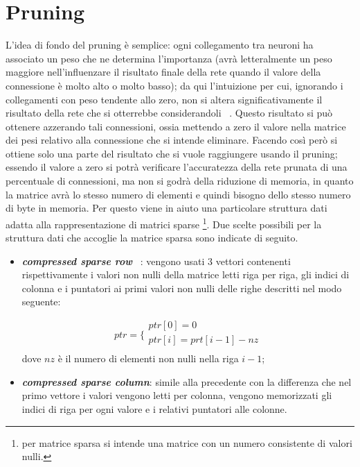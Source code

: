\documentclass[12pt]{report}
\begin{document}
\section{Pruning}\label{pruning}

L’idea di fondo del pruning è semplice: ogni collegamento tra neuroni ha associato un peso che ne determina l’importanza (avrà letteralmente un peso maggiore nell’influenzare il risultato finale della rete quando il valore della connessione è molto alto o molto basso); da qui l’intuizione per cui, ignorando i collegamenti con peso tendente allo zero, non si altera significativamente il risultato della rete che si otterrebbe considerandoli ~\cite{Pruning}.
Questo risultato si può ottenere azzerando tali connessioni, ossia mettendo a zero il valore nella matrice dei pesi relativo alla connessione che si intende eliminare. Facendo così però si ottiene solo una parte del risultato che si vuole raggiungere usando il pruning; essendo il valore a zero si potrà verificare l'accuratezza della rete prunata di una percentuale di connessioni, ma non si godrà della riduzione di memoria, in quanto la matrice avrà lo stesso numero di elementi e quindi bisogno dello stesso numero di byte in memoria. Per questo viene in aiuto una particolare struttura dati adatta alla rappresentazione di matrici sparse \footnote{per matrice sparsa si intende una matrice con un numero consistente di valori nulli.}. 
Due scelte possibili per la struttura dati che accoglie la matrice sparsa sono indicate di seguito.
\begin{itemize}
\item{\textbf{\textit{compressed sparse row}}} ~\cite{CSC}: vengono usati 3 vettori contenenti rispettivamente i valori non nulli della matrice letti riga per riga, gli indici di colonna e i puntatori ai primi valori non nulli delle righe descritti nel modo seguente: 

$$ptr =
\bigg \{
\begin{array}{ll}
ptr[0] = 0 \\
ptr[i] = prt[i - 1] - nz \\
\end{array}
$$
dove $nz$ è il numero di elementi non nulli nella riga $i - 1$;

\item{\textbf{\textit{compressed sparse column}}}: simile alla precedente con la differenza che nel primo vettore i valori vengono letti per colonna, vengono memorizzati gli indici di riga per ogni valore e i relativi puntatori alle colonne.
\end{itemize}
\end{document}
